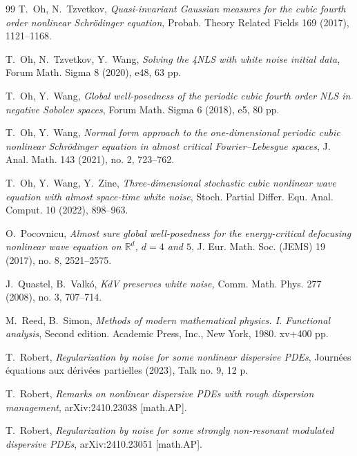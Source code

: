 \documentclass[letterpaper, 11pt,  reqno]{amsart}
\newcommand{\1}{\hspace{0.5mm}\text{I}\hspace{0.5mm}}
\newcommand{\R}{\mathbb{R}}
\numberwithin{equation}{section}
\numberwithin{theorem}{section}
\begin{document}
\begin{thebibliography}{99}
T.~Oh,  N.~Tzvetkov,
{\it  Quasi-invariant Gaussian measures for the cubic fourth order nonlinear Schr\"odinger equation}, 
 Probab. Theory Related Fields 169 (2017), 1121--1168. 


T.~Oh, N.~Tzvetkov, Y.~Wang,
{\it  Solving the 4NLS with white noise initial data}, Forum Math. Sigma 8 (2020), e48, 63 pp. 


T.~Oh, Y.~Wang,
{\it Global well-posedness of the periodic cubic fourth order NLS in negative Sobolev spaces},
 Forum Math. Sigma 6 (2018), e5, 80 pp. 

T.~Oh, Y.~Wang,
{\it  Normal form approach to the one-dimensional periodic cubic nonlinear Schr\"odinger equation in almost critical Fourier--Lebesgue spaces}, 
J. Anal. Math. 143 (2021), no. 2, 723--762. 



T.~Oh, Y.~Wang, Y.~Zine,
{\it  Three-dimensional stochastic cubic nonlinear wave equation with almost space-time white noise},  Stoch. Partial Differ. Equ. Anal. Comput. 10 (2022), 898--963.


%
%
%
%

O.~Pocovnicu, 
{\it Almost sure global well-posedness for the energy-critical defocusing nonlinear wave equation on $\R^d$,
 $d = 4$ and $5$}, J. Eur. Math. Soc. (JEMS) 19 (2017), no. 8, 2521--2575.


J.~Quastel, B.~Valk\'o, 
{\it KdV preserves white noise,} Comm. Math. Phys. 277 (2008), no. 3, 707--714.



M.~Reed, B.~Simon, 
{\it  Methods of modern mathematical physics. I. Functional analysis}, 
Second edition. Academic Press, Inc., New York, 1980. xv+400 pp.




T.~Robert, 
{\it Regularization by noise for some nonlinear dispersive PDEs},
 Journ\'ees \'equations aux d\'eriv\'ees partielles (2023), Talk no. 9, 12 p. 





T.~Robert, 
{\it Remarks on nonlinear dispersive PDEs with rough dispersion management}, 
arXiv:2410.23038 [math.AP].




T.~Robert, 
{\it Regularization by noise for some strongly non-resonant modulated dispersive PDEs}, 
arXiv:2410.23051 [math.AP].



\end{thebibliography}
\end{document}
